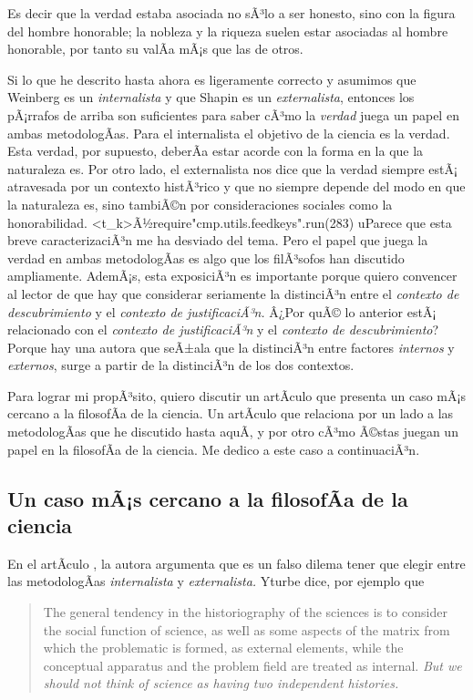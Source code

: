 Es decir que la verdad estaba asociada no sÃ³lo a ser honesto, sino con la figura del hombre honorable; la nobleza y la riqueza suelen estar asociadas al hombre honorable, por tanto su  valÃ­a mÃ¡s que las de otros.

Si lo que he descrito hasta ahora es ligeramente correcto y asumimos que Weinberg es un \emph{internalista} y que Shapin es un \emph{externalista}, entonces los pÃ¡rrafos de arriba son suficientes para saber cÃ³mo la \emph{verdad} juega un papel en ambas metodologÃ­as.
Para el internalista el objetivo de la ciencia es la verdad.
Esta verdad, por supuesto, deberÃ­a estar acorde con la forma en la que la naturaleza es.
Por otro lado, el externalista nos dice que la verdad siempre estÃ¡
atravesada por un contexto histÃ³rico y que no siempre depende del modo en
que la naturaleza es, sino tambiÃ©n por consideraciones sociales como la
honorabilidad. <t_k>Ã½require"cmp.utils.feedkeys".run(283) uParece que
esta breve caracterizaciÃ³n me ha desviado del tema. Pero el papel que
juega la verdad en ambas metodologÃ­as es algo que los filÃ³sofos han
discutido ampliamente. AdemÃ¡s, esta exposiciÃ³n es importante porque
quiero convencer al lector de que hay que considerar seriamente la
distinciÃ³n entre el \emph{contexto de descubrimiento} y el \emph{contexto
de justificaciÃ³n.} Â¿Por quÃ© lo anterior estÃ¡ relacionado con el
\emph{contexto de justificaciÃ³n} y el \emph{contexto de descubrimiento}?
Porque hay una autora que seÃ±ala que la distinciÃ³n entre factores
\emph{internos} y \emph{externos}, surge a partir de la distinciÃ³n de los
dos contextos.

Para lograr mi propÃ³sito, quiero discutir un artÃ­culo que presenta un caso mÃ¡s cercano a la filosofÃ­a de la ciencia.
Un artÃ­culo que relaciona por un lado a las metodologÃ­as que he discutido hasta aquÃ­, y por otro cÃ³mo Ã©stas juegan un papel en la filosofÃ­a de la ciencia.
Me dedico a este caso a continuaciÃ³n.

\subsection{Un caso mÃ¡s cercano a la filosofÃ­a de la ciencia}\label{sbc:yturbe}

\noindent En el artÃ­culo , la autora argumenta que es un falso dilema tener que elegir entre las metodologÃ­as \emph{internalista} y \emph{externalista.}
Yturbe dice, por ejemplo que

\begin{quote}
	The general tendency in the historiography of the sciences is to consider the social function of science, as weIl as some aspects of the matrix from which the problematic is formed, as external elements, while the conceptual apparatus and the problem field are treated as internal. \emph{But we should not think of science as having two independent histories.} \parencite[p.85, Ãnfasis agregado]{Yturbe1995}
\end{quote}

